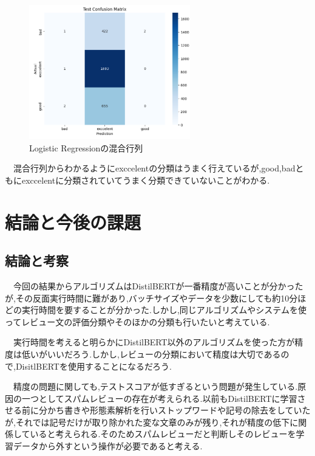 \documentclass[twocolumn,dvipdfmx]{article}
\newcounter{ex}
\begin{document}
\begin{figure}[H]
\begin{center}
\includegraphics[width=70mm]{LogisticRegression.png}
\caption{Logistic Regressionの混合行列}
\label{LogisticRegression.png}
\end{center}
\end{figure}

　混合行列からわかるようにexccelentの分類はうまく行えているが,good,badともにexccelentに分類されていてうまく分類できていないことがわかる.





\section{結論と今後の課題}
\label{conclusions}
\subsection{結論と考察}

　今回の結果からアルゴリズムはDistilBERTが一番精度が高いことが分かったが,その反面実行時間に難があり,バッチサイズやデータを少数にしても約10分ほどの実行時間を要することが分かった.しかし,同じアルゴリズムやシステムを使ってレビュー文の評価分類やそのほかの分類も行いたいと考えている.
 
　実行時間を考えると明らかにDistilBERT以外のアルゴリズムを使った方が精度は低いがいいだろう.しかし,レビューの分類において精度は大切であるので,DisitlBERTを使用することになるだろう.

　精度の問題に関しても,テストスコアが低すぎるという問題が発生している.原因の一つとしてスパムレビューの存在が考えられる.以前もDistilBERTに学習させる前に分かち書きや形態素解析を行いストップワードや記号の除去をしていたが,それでは記号だけが取り除かれた変な文章のみが残り,それが精度の低下に関係していると考えられる.そのためスパムレビューだと判断しそのレビューを学習データから外すという操作が必要であると考える.
 
\end{document}
